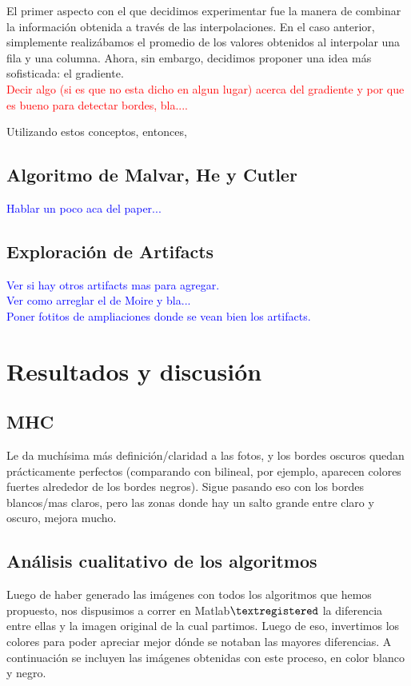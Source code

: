 \documentclass[a4paper]{article}
\begin{document}
El primer aspecto con el que decidimos experimentar fue la manera de combinar la información obtenida a través de las interpolaciones. En el caso anterior, simplemente realizábamos el promedio de los valores obtenidos al interpolar una fila y una columna. Ahora, sin embargo, decidimos proponer una idea más sofisticada: el gradiente. \\

\textcolor{red}{Decir algo (si es que no esta dicho en algun lugar) acerca del gradiente y por que es bueno para detectar bordes, bla....\\}

Utilizando estos conceptos, entonces, 

\newpage
\subsection{Algoritmo de Malvar, He y Cutler}
\textcolor{blue}{Hablar un poco aca del paper...}
\newpage
\subsection{Exploraci\'on de Artifacts}

\textcolor{blue}{Ver si hay otros artifacts mas para agregar.\\
Ver como arreglar el de Moire y bla...\\
Poner fotitos de ampliaciones donde se vean bien los artifacts.}


\newpage
\section{Resultados y discusi\'on}

\newpage
\subsection{MHC}
Le da muchísima más definición/claridad a las fotos, y los bordes oscuros quedan prácticamente perfectos (comparando con bilineal, por ejemplo, aparecen colores fuertes alrededor de los bordes negros). Sigue pasando eso con los bordes blancos/mas claros, pero las zonas donde hay un salto grande entre claro y oscuro, mejora mucho.

\newpage
\subsection{An\'alisis cualitativo de los algoritmos}
Luego de haber generado las im\'agenes con todos los algoritmos que hemos propuesto, nos dispusimos a correr en Matlab$\textregistered$  la diferencia entre ellas y la imagen original de la cual partimos. Luego de eso, invertimos los colores para poder apreciar mejor d\'onde se notaban las mayores diferencias. A continuaci\'on se incluyen las im\'agenes obtenidas con este proceso, en color blanco y negro.\\
\end{document}
